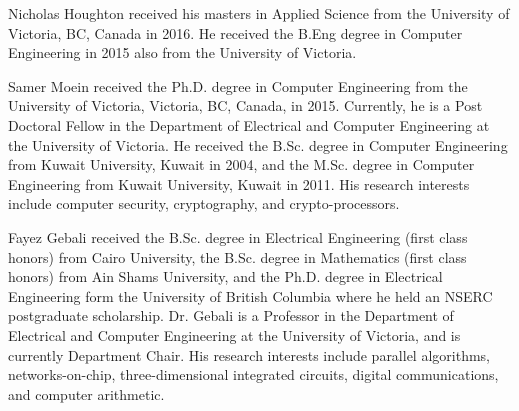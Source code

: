 \documentclass[journal, hidelinks]{IEEEtran}
\begin{document}
\printbibliography
\begin{IEEEbiography}{Nicholas Houghton}
	received his masters in Applied Science from the University of Victoria, BC, Canada in 2016.
	He received the B.Eng degree in Computer Engineering in 2015 also from the University of Victoria.
\end{IEEEbiography}
\vfill
\begin{IEEEbiography}{Samer Moein}
	received the Ph.D. degree in Computer Engineering from the University
	of Victoria, Victoria, BC, Canada, in 2015.
	Currently, he is a Post Doctoral Fellow in the Department of Electrical and Computer
	Engineering at the University of Victoria.
	He received the B.Sc. degree in Computer
	Engineering from Kuwait University, Kuwait in 2004, and the M.Sc.
	degree in Computer Engineering from Kuwait University, Kuwait in 2011.
	His research interests include computer security, cryptography, and crypto-processors.
\end{IEEEbiography}
\begin{IEEEbiography}{Fayez Gebali}
	received the B.Sc. degree in Electrical Engineering (first class honors) from Cairo University,
	the B.Sc. degree in Mathematics (first class honors) from Ain Shams University,
	and the Ph.D. degree in Electrical Engineering form the University of British Columbia where he held an NSERC postgraduate scholarship.
	Dr. Gebali is a Professor in the Department of Electrical and Computer Engineering at the University of Victoria,
	and is currently Department Chair.
	His research interests include parallel algorithms, networks-on-chip, three-dimensional integrated circuits, digital communications, and computer arithmetic.
\end{IEEEbiography}
\vfill





\end{document}
